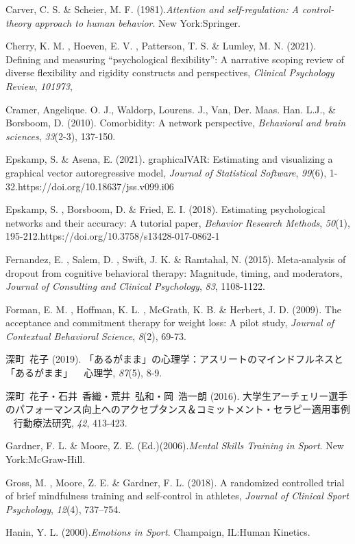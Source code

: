 \documentclass[12pt,a4paper,xelatex,ja=standard]{bxjsarticle}
\begin{document}
Carver, C. S. \& Scheier, M. F.
(1981).\emph{Attention and self-regulation: A control-theory approach to human behavior}.
New York:Springer.

Cherry, K. M. , Hoeven, E. V. , Patterson, T. S. \& Lumley, M. N.
(2021). Defining and measuring ``psychological flexibility'': A
narrative scoping review of diverse flexibility and rigidity constructs
and perspectives, \emph{Clinical Psychology Review}, \emph{101973},

Cramer, Ang\textquotesingle elique. O. J., Waldorp, Lourens. J., Van,
Der. Maas. Han. L.J., \& Borsboom, D. (2010). Comorbidity: A network
perspective, \emph{Behavioral and brain sciences}, \emph{33}(2-3),
137-150.

Epskamp, S. \& Asena, E. (2021). graphicalVAR: Estimating and
visualizing a graphical vector autoregressive model,
\emph{Journal of Statistical Software}, \emph{99}(6),
1-32.https://doi.org/10.18637/jss.v099.i06

Epskamp, S. , Borsboom, D. \& Fried, E. I. (2018). Estimating
psychological networks and their accuracy: A tutorial paper,
\emph{Behavior Research Methods}, \emph{50}(1),
195-212.https://doi.org/10.3758/s13428-017-0862-1

Fernandez, E. , Salem, D. , Swift, J. K. \& Ramtahal, N. (2015).
Meta-analysis of dropout from cognitive behavioral therapy: Magnitude,
timing, and moderators,
\emph{Journal of Consulting and Clinical Psychology}, \emph{83},
1108-1122.

Forman, E. M. , Hoffman, K. L. , McGrath, K. B. \& Herbert, J. D.
(2009). The acceptance and commitment therapy for weight loss: A pilot
study, \emph{Journal of Contextual Behavioral Science}, \emph{8}(2),
69-73.

深町~花子 (2019).
「あるがまま」の心理学：アスリートのマインドフルネスと「あるがまま」 ~
心理学, \emph{87}(5), 8-9.

深町~花子・石井~香織・荒井~弘和・岡~浩一朗 (2016).
大学生アーチェリー選手のパフォーマンス向上へのアクセプタンス＆コミットメント・セラピー適用事例
~ 行動療法研究, \emph{42}, 413-423.

Gardner, F. L. \& Moore, Z. E.
(Ed.)(2006).\emph{Mental Skills Training in Sport}. New
York:McGraw-Hill.

Gross, M. , Moore, Z. E. \& Gardner, F. L. (2018). A randomized
controlled trial of brief mindfulness training and self-control in
athletes, \emph{Journal of Clinical Sport Psychology}, \emph{12}(4),
737--754.

Hanin, Y. L. (2000).\emph{Emotions in Sport}. Champaign, IL:Human
Kinetics.
\end{document}
